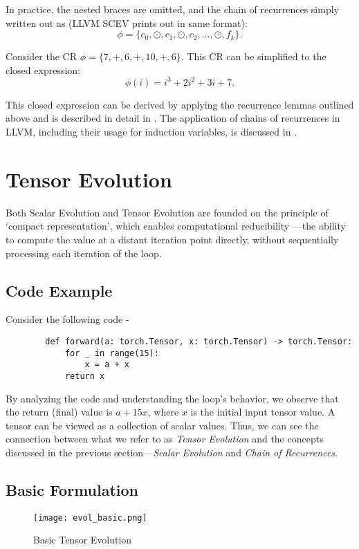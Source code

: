 \documentclass{article}
\begin{document}
    In practice, the nested braces are omitted, and the chain of recurrences
    simply written out as (LLVM SCEV prints out in same format):
    \[
    \phi = \{c_0, \odot, c_1, \odot, c_2, \dots, \odot, f_k\}.
    \]
    
    Consider the CR $\phi = \{7, +, 6, +, 10, +, 6\}$. This CR can be simplified to the closed expression:
    \[
    \phi(i) = i^3 + 2i^2 + 3i + 7.
    \]
    
    
This closed expression can be derived by applying the recurrence lemmas outlined
above and is described in detail in \cite{ZimaRealPaper, Zima, OlafRecurrence}.
The application of chains of recurrences in LLVM, including their usage for 
induction variables, is discussed in \cite{scev_j}.
    
    \section{Tensor Evolution}
    Both Scalar Evolution and Tensor Evolution are founded on the principle of `compact representation',
     which enables computational reducibility \cite{Wolfram}—the ability to compute the value at a distant
      iteration point directly, without sequentially processing each iteration of the loop.
    
    \subsection{Code Example}
    Consider the following code -    
    \begin{verbatim}
        def forward(a: torch.Tensor, x: torch.Tensor) -> torch.Tensor:
            for _ in range(15):
                x = a + x 
            return x
    \end{verbatim}
    
    
    By analyzing the code and understanding the loop's behavior, we observe that the
     return (final) value is  $a+15x$, where $x$ is the initial input tensor value.
      A tensor can be viewed as a collection of scalar values. Thus, we can see the 
      connection between what we refer to as \textit{Tensor Evolution} and the concepts discussed
       in the previous section—\textit{Scalar Evolution} and \textit{Chain of Recurrences}.

       
    \subsection{Basic Formulation}    
    \begin{figure}[h!]
    \centering
    \texttt{[image: evol\_basic.png]}
    \caption{Basic Tensor Evolution}
    \label{fig:basic_TEV}
    \end{figure}
 
\end{document}
